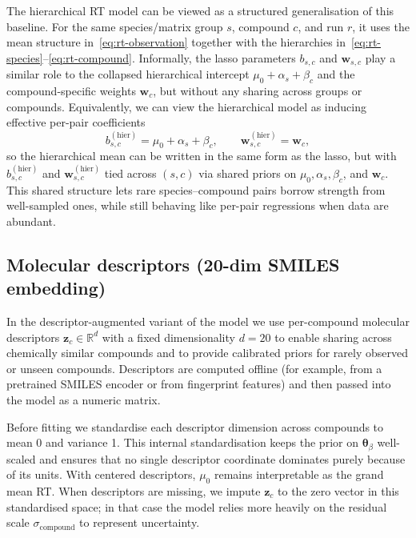\documentclass[11pt]{article}
\begin{document}
The hierarchical RT model can be viewed as a structured generalisation of this
baseline. For the same species/matrix group $s$, compound $c$, and run $r$, it
uses the mean structure in~\eqref{eq:rt-observation} together with the
hierarchies in~\eqref{eq:rt-species}--\eqref{eq:rt-compound}. Informally, the
lasso parameters $b_{s,c}$ and $\bm{w}_{s,c}$ play a similar role to the
collapsed hierarchical intercept $\mu_0+\alpha_s+\beta_c$ and the
compound-specific weights $\bm{w}_c$, but without any sharing across groups or
compounds. Equivalently, we can view the hierarchical model as inducing
effective per-pair coefficients
\begin{equation}
  b^{(\mathrm{hier})}_{s,c}
  =
  \mu_0+\alpha_s+\beta_c,
  \qquad
  \bm{w}^{(\mathrm{hier})}_{s,c}
  =
  \bm{w}_c,
  \label{eq:hier-effective}
	\end{equation}
	so the hierarchical mean can be written in the same form as the lasso,
	but with $b^{(\mathrm{hier})}_{s,c}$ and $\bm{w}^{(\mathrm{hier})}_{s,c}$ tied
	across $(s,c)$ via shared priors on $\mu_0,\alpha_s,\beta_c$, and $\bm{w}_c$. This
	shared structure lets rare species--compound pairs borrow strength from well-sampled
	ones, while still behaving like per-pair regressions when data are abundant.

\subsection{Molecular descriptors (20-dim SMILES embedding)}

In the descriptor-augmented variant of the model we use per-compound molecular
descriptors $\bm{z}_c\in\mathbb{R}^{d}$ with a fixed
dimensionality $d=20$ to enable sharing across chemically similar compounds and to
provide calibrated priors for rarely observed or unseen compounds. Descriptors are
computed offline (for example, from a pretrained SMILES encoder or from fingerprint
features) and then passed into the model as a numeric matrix.

Before fitting we standardise each descriptor dimension across compounds to mean 0 and
variance 1. This internal standardisation keeps the prior on $\bm{\theta}_\beta$
well-scaled and ensures that no single descriptor coordinate dominates purely because
of its units. With centered descriptors, $\mu_0$ remains interpretable as the grand
mean RT. When descriptors are missing, we impute $\bm{z}_c$ to the zero vector in this
standardised space; in that case the model relies more heavily on the residual scale
$\sigma_{\mathrm{compound}}$ to represent uncertainty.
\end{document}

